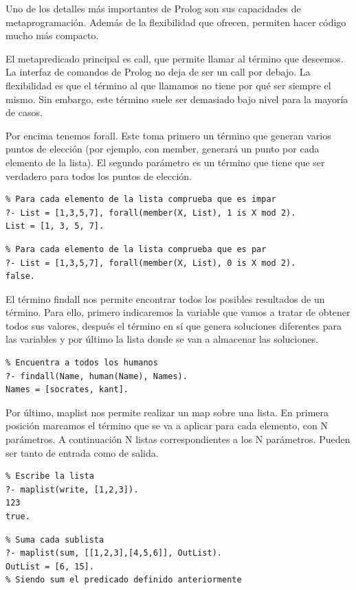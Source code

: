 \documentclass[openright,twoside,12pt]{book}
\begin{document}
Uno de los detalles más importantes de Prolog son sus capacidades de metaprogramación. Además de la flexibilidad que ofrecen, permiten hacer código mucho más compacto.

El metapredicado principal es call, que permite llamar al término que deseemos. La interfaz de comandos de Prolog no deja de ser un call por debajo. La flexibilidad es que el término al que llamamos no tiene por qué ser siempre el mismo. Sin embargo, este término suele ser demasiado bajo nivel para la mayoría de casos.

Por encima tenemos forall. Este toma primero un término que generan varios puntos de elección (por ejemplo, con member, generará un punto por cada elemento de la lista). El segundo parámetro es un término que tiene que ser verdadero para todos los puntos de elección.

\begin{lstlisting}
% Para cada elemento de la lista comprueba que es impar
?- List = [1,3,5,7], forall(member(X, List), 1 is X mod 2).
List = [1, 3, 5, 7].
\end{lstlisting}
\begin{lstlisting}
% Para cada elemento de la lista comprueba que es par
?- List = [1,3,5,7], forall(member(X, List), 0 is X mod 2).
false.
\end{lstlisting}

El término findall nos permite encontrar todos los posibles resultados de un término. Para ello, primero indicaremos la variable que vamos a tratar de obtener todos sus valores, después el término en sí que genera soluciones diferentes para las variables y por último la lista donde se van a almacenar las soluciones.

\begin{lstlisting}
% Encuentra a todos los humanos
?- findall(Name, human(Name), Names).
Names = [socrates, kant].
\end{lstlisting}

Por último, maplist nos permite realizar un map sobre una lista. En primera posición marcamos el término que se va a aplicar para cada elemento, con N parámetros. A continuación N listas correspondientes a los N parámetros. Pueden ser tanto de entrada como de salida.

\begin{lstlisting}
% Escribe la lista
?- maplist(write, [1,2,3]).
123
true.
\end{lstlisting}
\begin{lstlisting}
% Suma cada sublista
?- maplist(sum, [[1,2,3],[4,5,6]], OutList).
OutList = [6, 15].
% Siendo sum el predicado definido anteriormente
\end{lstlisting}
\end{document}
